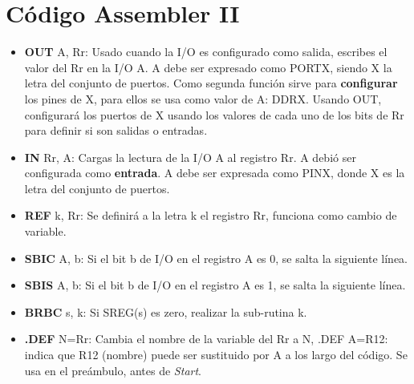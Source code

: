 \documentclass[
	12pt, %
	fleqn, %
	a4paper, %
]{LegrandOrangeBook}
\begin{document}
\section{Código Assembler II}\label{Código Assembler II}
\begin{itemize}
\item \textbf{OUT} A, Rr: Usado cuando la I/O es configurado como salida, escribes el valor del Rr en la I/O A. A debe ser expresado como PORTX, siendo X la letra del conjunto de puertos. Como segunda función sirve para \textbf{configurar} los pines de X, para ellos se usa como valor de A: DDRX. Usando OUT, configurará los puertos de X usando los valores de cada uno de los bits de Rr para definir si son salidas o entradas.
\item \textbf{IN} Rr, A: Cargas la lectura de la I/O A al registro Rr. A debió ser configurada como \textbf{entrada}. A debe ser expresada como PINX, donde X es la letra del conjunto de puertos.
\item \textbf{REF} k, Rr: Se definirá a la letra k el registro Rr, funciona como cambio de variable.
\item \textbf{SBIC} A, b: Si el bit b de I/O en el registro A es 0, se salta la siguiente línea.
\item \textbf{SBIS} A, b: Si el bit b de I/O en el registro A es 1, se salta la siguiente línea.
\item \textbf{BRBC} s, k: Si SREG(s) es zero, realizar la sub-rutina k.
\item \textbf{.DEF} N=Rr:  Cambia el nombre de la variable del Rr a N, .DEF A=R12: indica que R12 (nombre) puede ser sustituido por A a los largo del código. Se usa en el preámbulo, antes de \textit{Start}.
\end{itemize}
\end{document}
